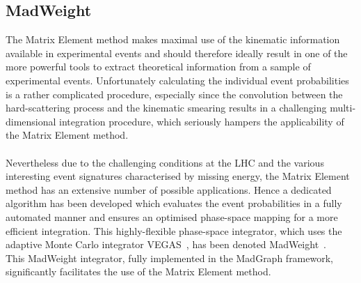 \subsection{MadWeight} \label{subsec::MW}
The Matrix Element method makes maximal use of the kinematic information available in experimental events and should therefore ideally result in one of the more powerful tools to extract theoretical information from a sample of experimental events.
Unfortunately calculating the individual event probabilities is a rather complicated procedure, especially since the convolution between the hard-scattering process and the kinematic smearing results in a challenging multi-dimensional integration procedure, which seriously hampers the applicability of the Matrix Element method.
\\
\\
Nevertheless due to the challenging conditions at the LHC and the various interesting event signatures characterised by missing energy, the Matrix Element method has an extensive number of possible applications.
Hence a dedicated algorithm has been developed which evaluates the event probabilities in a fully automated manner and ensures an optimised phase-space mapping for a more efficient integration.
This highly-flexible phase-space integrator, which uses the adaptive Monte Carlo integrator VEGAS~\cite{VEGAS}, has been denoted MadWeight~\cite{MadWeightPaper}.
\\
This MadWeight integrator, fully implemented in the MadGraph framework, significantly facilitates the use of the Matrix Element method. 

